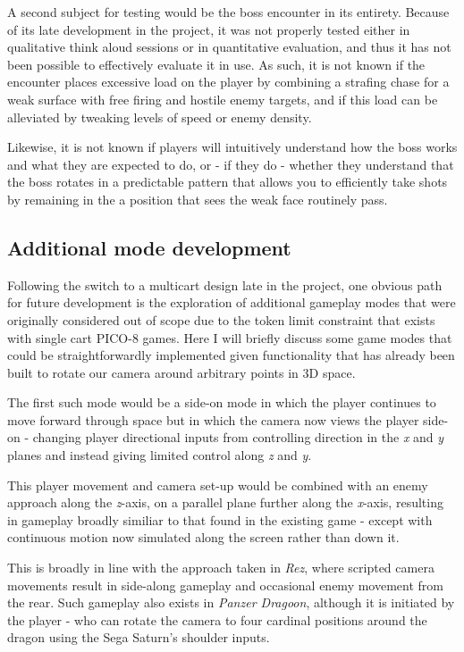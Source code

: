 \documentclass[11pt]{article}
\begin{document}
A second subject for testing would be the boss encounter in its entirety. Because of its late
development in the project, it was not properly tested either in qualitative think aloud sessions
or in quantitative evaluation, and thus it has not been possible to effectively evaluate it 
in use. As such, it is not known if the encounter places excessive load on the player by 
combining a strafing chase for a weak surface with free firing and hostile enemy targets, and
if this load can be alleviated by tweaking levels of speed or enemy density.

Likewise, it is not known if players will intuitively understand how the boss works and what
they are expected to do, or - if they do - whether they understand that the boss rotates in a 
predictable pattern that allows you to efficiently take shots by remaining in the a position
that sees the weak face routinely pass.

\subsection{Additional mode development}

Following the switch to a multicart design late in the project, one obvious path for future
development is the exploration of additional gameplay modes that were originally considered
out of scope due to the token limit constraint that exists with single cart PICO-8 games.
Here I will briefly discuss some game modes that could be straightforwardly implemented
given functionality that has already been built to rotate our camera around arbitrary
points in 3D space.

The first such mode would be a side-on mode in which the player continues to move forward
through space but in which the camera now views the player side-on - changing player directional
inputs from controlling direction in the \textit{x} and \textit{y} planes and instead giving
limited control along \textit{z} and \textit{y}.

This player movement and camera set-up would be combined with an enemy approach along the
\textit{z}-axis, on a parallel plane further along the \textit{x}-axis, resulting in gameplay
broadly similiar to that found in the existing game - except with continuous motion now
simulated along the screen rather than down it.

This is broadly in line with the approach taken in \textit{Rez}, where scripted camera movements
result in side-along gameplay and occasional enemy movement from the rear. Such gameplay also
exists in \textit{Panzer Dragoon}, although it is initiated by the player - who can rotate the
camera to four cardinal positions around the dragon using the Sega Saturn's shoulder inputs.
\end{document}
